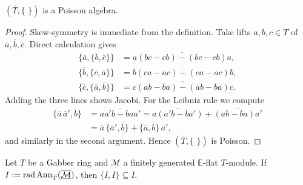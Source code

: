 \begin{lemma}\label{lem:poisson}
	$(\overline T,\{\,\,\})$ is a Poisson algebra.
\end{lemma}
\begin{proof}
	Skew-symmetry is immediate from the definition. Take lifts $a,b,c\in T$ of
	$\overline a,\overline b,\overline c$. Direct calculation gives
	\begin{align*}
		\{\overline a,\{\overline b,\overline c\}\}
		 & = \overline{a(bc-cb) - (bc-cb) a}, \\
		\{\overline b,\{\overline c,\overline a\}\}
		 & = \overline{b(ca-ac) - (ca-ac) b}, \\
		\{\overline c,\{\overline a,\overline b\}\}
		 & = \overline{c(ab-ba) - (ab-ba) c}.
	\end{align*}
	Adding the three lines shows Jacobi. For the Leibniz rule we compute
	\begin{align*}
		\{\overline a\,\overline a',\overline b\}
		 & = \overline{aa' b - ba a'}
		= \overline{a(a' b - b a')} + \overline{(ab - ba)a'}                                        \\
		 & = \overline a\,\{\overline a',\overline b\} + \{\overline a,\overline b\}\,\overline a',
	\end{align*}
	and similarly in the second argument. Hence $(\overline T,\{\,\,\})$ is Poisson.
\end{proof}

\begin{theorem}\label{thm:gabber-II}
	Let $T$ be a Gabber ring and $\underline{\mathcal M}$ a finitely generated $\mathbb E$-flat $T$-module. If
	$I:=\operatorname{rad}\operatorname{Ann}_{\overline T}(\overline{\underline{\mathcal M}})$, then $\{I,I\}\subseteq I$.
\end{theorem}

